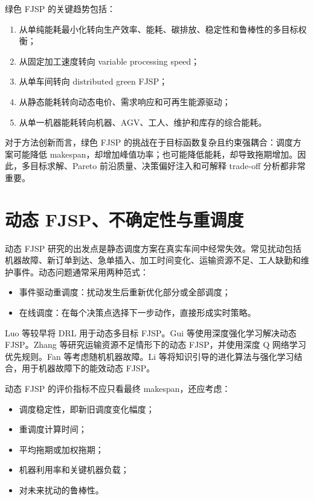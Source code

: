 \documentclass[UTF8,a4paper,11pt]{ctexart}
\begin{document}
绿色 FJSP 的关键趋势包括：
\begin{enumerate}
    \item 从单纯能耗最小化转向生产效率、能耗、碳排放、稳定性和鲁棒性的多目标权衡；
    \item 从固定加工速度转向 variable processing speed；
    \item 从单车间转向 distributed green FJSP；
    \item 从静态能耗转向动态电价、需求响应和可再生能源驱动；
    \item 从单一机器能耗转向机器、AGV、工人、维护和库存的综合能耗。
\end{enumerate}

对于方法创新而言，绿色 FJSP 的挑战在于目标函数复杂且约束强耦合：调度方案可能降低 makespan，却增加峰值功率；也可能降低能耗，却导致拖期增加。因此，多目标求解、Pareto 前沿质量、决策偏好注入和可解释 trade-off 分析都非常重要。

\section{动态 FJSP、不确定性与重调度}

动态 FJSP 研究的出发点是静态调度方案在真实车间中经常失效。常见扰动包括机器故障、新订单到达、急单插入、加工时间变化、运输资源不足、工人缺勤和维护事件。动态问题通常采用两种范式：
\begin{itemize}
    \item 事件驱动重调度：扰动发生后重新优化部分或全部调度；
    \item 在线调度：在每个决策点选择下一步动作，直接形成实时策略。
\end{itemize}

Luo 等较早将 DRL 用于动态多目标 FJSP\cite{Luo2021DRL}。Gui 等使用深度强化学习解决动态 FJSP\cite{Gui2023DDPG}。Zhang 等研究运输资源不足情形下的动态 FJSP，并使用深度 Q 网络学习优先规则\cite{Zhang2023InsufficientTR}。Fan 等考虑随机机器故障\cite{Fan2024Breakdown}。Li 等将知识引导的进化算法与强化学习结合，用于机器故障下的能效动态 FJSP\cite{Li2025KEARL}。

动态 FJSP 的评价指标不应只看最终 makespan，还应考虑：
\begin{itemize}
    \item 调度稳定性，即新旧调度变化幅度；
    \item 重调度计算时间；
    \item 平均拖期或加权拖期；
    \item 机器利用率和关键机器负载；
    \item 对未来扰动的鲁棒性。
\end{itemize}
\end{document}
